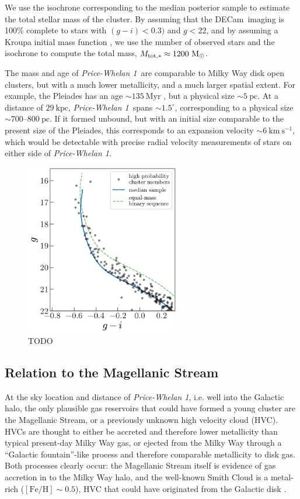 \documentclass[modern]{aastex62}
\newcommand{\decam}{DECam}
\newcommand{\msun}{\textrm{M}_\odot}
\newcommand{\kms}{\ensuremath{\textrm{km}~\textrm{s}^{-1}}}
\newcommand{\feh}{\ensuremath{[\textrm{Fe} / \textrm{H}]}}
\newcommand{\clustername}{\textsl{Price-Whelan 1}}
\newcommand{\cldist}{\ensuremath{29~\textrm{kpc}}}
\begin{document}
We use the isochrone corresponding to the median posterior sample to estimate the total stellar mass of the cluster.
By assuming that the \decam\ imaging is 100\% complete to stars with $(g-i) < 0.3)$ and $g < 22$, and by assuming a Kroupa initial mass function \citep{Kroupa:TODO}, we use the number of observed stars and the isochrone to compute the total mass, $M_{\rm tot, *} \approx 1200~\msun$.

The mass and age of \clustername\ are comparable to Milky Way disk open clusters, but with a much lower metallicity, and a much larger spatial extent.
For example, the Pleiades has an age $\sim 135~\textrm{Myr}$ \citep{Gossage:2018}, but a physical size $\sim 5~\textrm{pc}$.
At a distance of $\cldist$, \clustername\ spans $\sim 1.5^\circ$, corresponding to a physical size $\sim 700$--$800~\textrm{pc}$.
If it formed unbound, but with an initial size comparable to the present size of the Pleiades, this corresponds to an expansion velocity $\sim 6~\kms$, which would be detectable with precise radial velocity measurements of stars on either side of \clustername.

\begin{figure}
\centering
\includegraphics[width=0.6\textwidth]{figures/hierarch-results.pdf}
\caption{TODO}
\label{fig:hierarch-iso}
\end{figure}


\subsection{Relation to the Magellanic Stream}
\label{sec:higas}

At the sky location and distance of \clustername, i.e. well into the Galactic halo, the only plausible gas reservoirs that could have formed a young cluster are the Magellanic Stream, or a previously unknown high velocity cloud (HVC).
HVCs are thought to either be accreted and therefore lower metallicity than typical present-day Milky Way gas, or ejected from the Milky Way through a ``Galactic fountain''-like process and therefore comparable metallicity to disk gas.
Both processes clearly occur: the Magellanic Stream itself is evidence of gas accretion in to the Milky Way halo, and the well-known Smith Cloud \citep{TODO} is a metal-rich ($\feh \sim 0.5$), HVC that could have originated from the Galactic disk \citep{TODO}.
\end{document}
